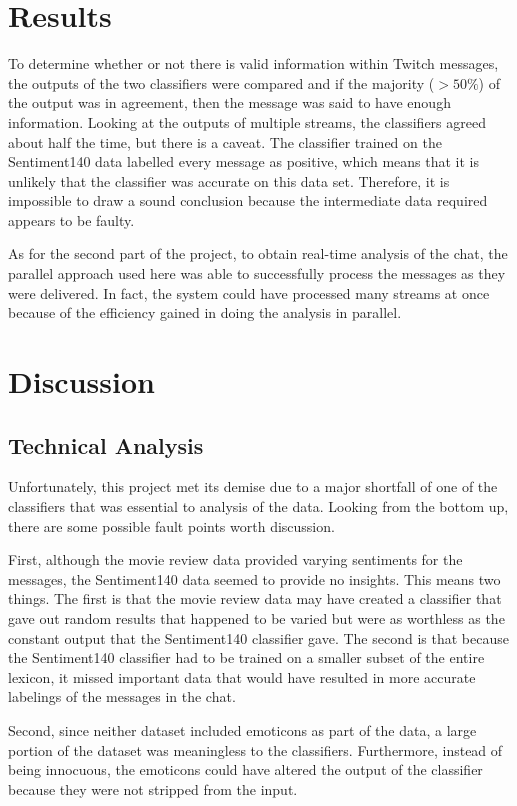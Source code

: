 \documentclass[12pt]{article}
\begin{document}
\section{Results}
To determine whether or not there is valid information within Twitch messages, the outputs of the two classifiers were compared and if the majority ($>50\%$) of the output was in agreement, then the message was said to have enough information. Looking at the outputs of multiple streams, the classifiers agreed about half the time, but there is a caveat. The classifier trained on the Sentiment140 data labelled every message as positive, which means that it is unlikely that the classifier was accurate on this data set. Therefore, it is impossible to draw a sound conclusion because the intermediate data required appears to be faulty.

As for the second part of the project, to obtain real-time analysis of the chat, the parallel approach used here was able to successfully process the messages as they were delivered. In fact, the system could have processed many streams at once because of the efficiency gained in doing the analysis in parallel.

\section{Discussion}
\subsection{Technical Analysis}
Unfortunately, this project met its demise due to a major shortfall of one of the classifiers that was essential to analysis of the data. Looking from the bottom up, there are some possible fault points worth discussion.

First, although the movie review data provided varying sentiments for the messages, the Sentiment140 data seemed to provide no insights. This means two things. The first is that the movie review data may have created a classifier that gave out random results that happened to be varied but were as worthless as the constant output that the Sentiment140 classifier gave. The second is that because the Sentiment140 classifier had to be trained on a smaller subset of the entire lexicon, it missed important data that would have resulted in more accurate labelings of the messages in the chat.

Second, since neither dataset included emoticons as part of the data, a large portion of the dataset was meaningless to the classifiers. Furthermore, instead of being innocuous, the emoticons could have altered the output of the classifier because they were not stripped from the input.
\end{document}
